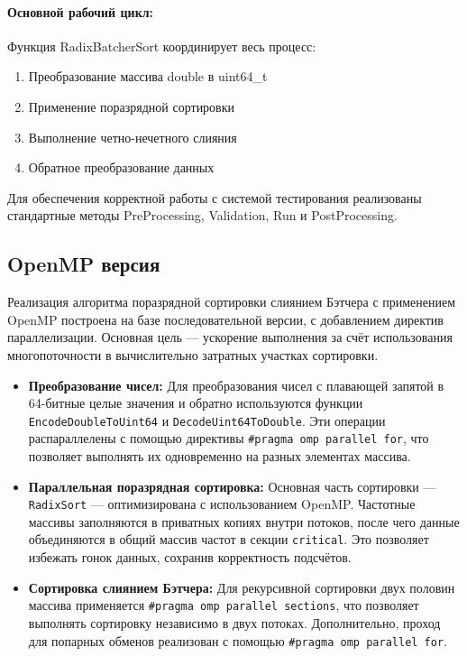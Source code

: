 \documentclass[12pt]{article}
\begin{document}
\paragraph{Основной рабочий цикл:}
Функция RadixBatcherSort координирует весь процесс:
\begin{enumerate}
	\item Преобразование массива double в uint64\_t
	\item Применение поразрядной сортировки
	\item Выполнение четно-нечетного слияния
	\item Обратное преобразование данных
\end{enumerate}
Для обеспечения корректной работы с системой тестирования реализованы стандартные методы PreProcessing, Validation, Run и PostProcessing.

\subsection{OpenMP версия}

Реализация алгоритма поразрядной сортировки слиянием Бэтчера с применением OpenMP построена на базе последовательной версии, с добавлением директив параллелизации. Основная цель — ускорение выполнения за счёт использования многопоточности в вычислительно затратных участках сортировки.

\begin{itemize}
  \item \textbf{Преобразование чисел:}  
  Для преобразования чисел с плавающей запятой в 64-битные целые значения и обратно используются функции \texttt{EncodeDoubleToUint64} и \texttt{DecodeUint64ToDouble}. Эти операции распараллелены с помощью директивы \texttt{\#pragma omp parallel for}, что позволяет выполнять их одновременно на разных элементах массива.

  \item \textbf{Параллельная поразрядная сортировка:}  
  Основная часть сортировки — \texttt{RadixSort} — оптимизирована с использованием OpenMP. Частотные массивы заполняются в приватных копиях внутри потоков, после чего данные объединяются в общий массив частот в секции \texttt{critical}. Это позволяет избежать гонок данных, сохранив корректность подсчётов.

  \item \textbf{Сортировка слиянием Бэтчера:}  
  Для рекурсивной сортировки двух половин массива применяется \texttt{\#pragma omp parallel sections}, что позволяет выполнять сортировку независимо в двух потоках. Дополнительно, проход для попарных обменов реализован с помощью \texttt{\#pragma omp parallel for}.
\end{itemize}
\end{document}
